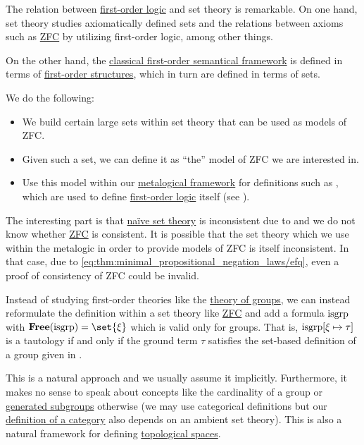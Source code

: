 \begin{remark}\label{rem:set_definition_recursion}
  The relation between \hyperref[subsec:first_order_logic]{first-order logic} and set theory is remarkable. On one hand, set theory studies axiomatically defined sets and the relations between axioms such as \hyperref[def:zfc]{ZFC} by utilizing first-order logic, among other things.

  On the other hand, the \hyperref[def:first_order_semantics]{classical first-order semantical framework} is defined in terms of \hyperref[def:first_order_structure]{first-order structures}, which in turn are defined in terms of sets.

  We do the following:
  \begin{itemize}
    \item We build certain large sets within set theory that can be used as models of ZFC.
    \item Given such a set, we can define it as \enquote{the} model of ZFC we are interested in.
    \item Use this model within our \hyperref[rem:metalogic]{metalogical framework} for definitions such as , which are used to define \hyperref[subsec:first_order_logic]{first-order logic} itself (see ).
  \end{itemize}

  The interesting part is that \hyperref[def:naive_set_theory]{na\"ive set theory} is inconsistent due to  and we do not know whether \hyperref[def:zfc]{ZFC} is consistent. It is possible that the set theory which we use within the metalogic in order to provide models of ZFC is itself inconsistent. In that case, due to \eqref{eq:thm:minimal_propositional_negation_laws/efq}, even a proof of consistency of ZFC could be invalid.
\end{remark}

\begin{remark}\label{rem:first_order_theories_in_zfc}
  Instead of studying first-order theories like the \hyperref[def:group/theory]{theory of groups}, we can instead reformulate the definition within a set theory like \hyperref[def:zfc]{ZFC} and add a formula \( \operatorname{isgrp} \) with \( \boldop{Free}(\op{isgrp}) = \set{ \xi } \) which is valid only for groups. That is, \( \operatorname{isgrp}[\xi \mapsto \tau] \) is a tautology if and only if the ground term \( \tau \) satisfies the set-based definition of a group given in .

  This is a natural approach and we usually assume it implicitly. Furthermore, it makes no sense to speak about concepts like the cardinality of a group or \hyperref[def:first_order_generated_substructure]{generated subgroups} otherwise (we may use categorical definitions but our \hyperref[def:category]{definition of a category} also depends on an ambient set theory). This is also a natural framework for defining \hyperref[def:topological_space]{topological spaces}.
\end{remark}
